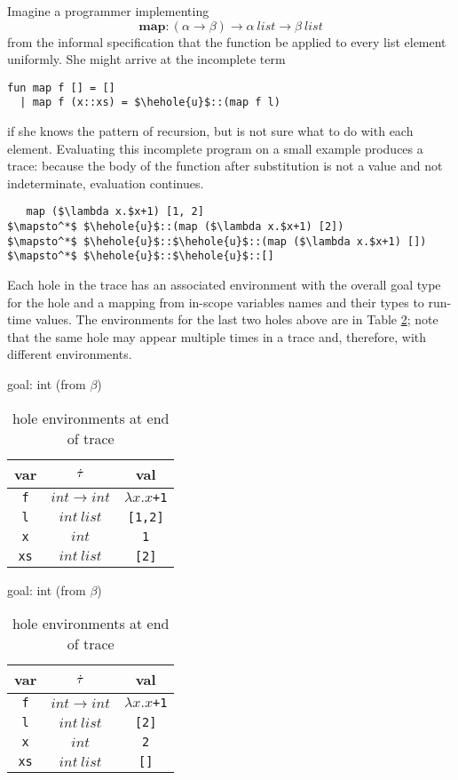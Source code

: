 Imagine a programmer implementing $$\mathbf{map} : (\alpha \to \beta) \to
\alpha ~\mathit{list} \to \beta ~\mathit{list}$$ from the informal
specification that the function be applied to every list element uniformly.
She might arrive at the incomplete term
\begin{lstlisting}
fun map f [] = []
  | map f (x::xs) = $\hehole{u}$::(map f l)
\end{lstlisting}
if she knows the pattern of recursion, but is not sure what to do with each
element. Evaluating this incomplete program on a small example produces a
trace: because the body of the function after substitution is not a value
and not indeterminate, evaluation continues.
\begin{lstlisting}
   map ($\lambda x.$x+1) [1, 2]
$\mapsto^*$ $\hehole{u}$::(map ($\lambda x.$x+1) [2])
$\mapsto^*$ $\hehole{u}$::$\hehole{u}$::(map ($\lambda x.$x+1) [])
$\mapsto^*$ $\hehole{u}$::$\hehole{u}$::[]
\end{lstlisting}
Each hole in the trace has an associated environment with the overall goal
type for the hole and a mapping from in-scope variables names and their
types to run-time values. The environments for the last two holes above are
in Table \ref{tabx}; note that the same hole may appear multiple times in a
trace and, therefore, with different environments.

\begin{table}[h!]
  \begin{subtable}{.5\linewidth}
    \caption{goal: int (from $\beta$)}
    \centering
        {
          \footnotesize
          \begin{tabular}{c|c|c}
            var & $\dot{\tau}$ & val\\
            \hline
            \texttt{f} & $int \to int$ & $\lambda x.x$\texttt{+1}\\
            \texttt{l} & $int ~list$ & \texttt{[1,2]}\\
            \texttt{x} & $int$ & \texttt{1}\\
            \texttt{xs} & $int ~list$ & \texttt{[2]}\\
          \end{tabular}
        }
  \end{subtable}%
  \begin{subtable}{.5\linewidth}
    \caption{goal: int (from $\beta$)}
    \centering
        {
          \footnotesize
          \begin{tabular}{c|c|c}
            var & $\dot{\tau}$ & val\\
            \hline
            \texttt{f} & $int \to int$ & $\lambda x.x$\texttt{+1}\\
            \texttt{l} & $int ~list$ & \texttt{[2]}\\
            \texttt{x} & $int$ & \texttt{2}\\
            \texttt{xs} & $int ~list$ & \texttt{[]}\\
          \end{tabular}
        }
  \end{subtable}
  \caption{hole environments at end of trace}
  \label{tabx}
\end{table}

